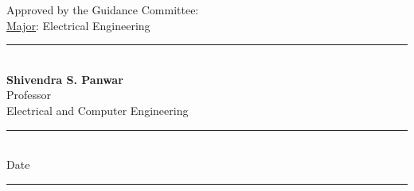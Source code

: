  \newpage 
 
 \baselineskip
 \setcounter{page}{2}
 \vspace{0.5in}
 \noindent Approved by the Guidance Committee:%
 \vspace{0.5in} \\
\underline{Major}:\makebox[0.1in]{ } Electrical Engineering  %
\vspace{0.6in} \\
 \makebox[2.8in]{ } \rule{2.5in}{.005in} \vspace{0.05in} \\ 
 \makebox[2.8in]{ } {\bf Shivendra S. Panwar} \vspace{0.05in} \\
 \makebox[2.8in]{ } Professor \vspace{0.05in} \\
 \makebox[2.8in]{ } Electrical and Computer Engineering %
 \vspace{0.3in}  \\ 
 \makebox[2.8in]{ } \rule{2in}{.005in} \vspace{0.05in} \\
 \makebox[3.6in]{ } Date \vspace{0.6in}\\
 \makebox[2.8in]{ } \rule{2.5in}{.005in} \vspace{0.05in} \\
